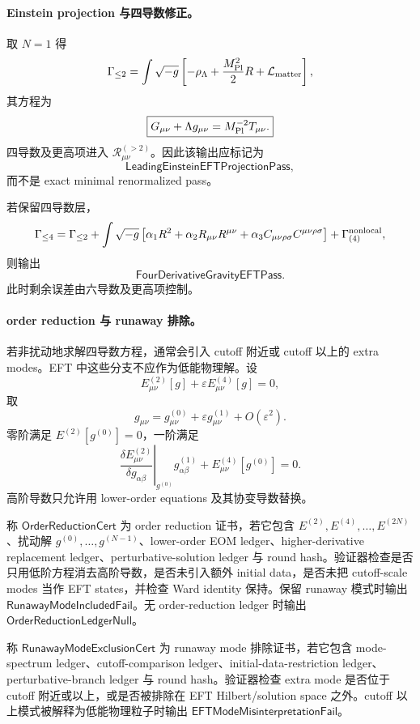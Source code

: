 \paragraph{Einstein projection 与四导数修正。}
取 \(N=1\) 得
\[
\Gamma_{\le2}
=
\int\sqrt{-g}
\left[
-\rho_\Lambda+\frac{M_{\rm Pl}^2}{2}R+\mathcal L_{\rm matter}
\right],
\]
其方程为
\[
\boxed{
G_{\mu\nu}+\Lambda g_{\mu\nu}
=
M_{\rm Pl}^{-2}T_{\mu\nu}.
}
\]
四导数及更高项进入 \(\mathcal R_{\mu\nu}^{(>2)}\)。因此该输出应标记为
\[
\mathsf{LeadingEinsteinEFTProjectionPass},
\]
而不是 exact minimal renormalized pass。

若保留四导数层，
\[
\Gamma_{\le4}
=
\Gamma_{\le2}
+
\int\sqrt{-g}
\left[
\alpha_1R^2+\alpha_2R_{\mu\nu}R^{\mu\nu}
+\alpha_3C_{\mu\nu\rho\sigma}C^{\mu\nu\rho\sigma}
\right]
+
\Gamma_{(4)}^{\rm nonlocal},
\]
则输出
\[
\mathsf{FourDerivativeGravityEFTPass}.
\]
此时剩余误差由六导数及更高项控制。

\paragraph{order reduction 与 runaway 排除。}
若非扰动地求解四导数方程，通常会引入 cutoff 附近或 cutoff 以上的 extra modes。EFT 中这些分支不应作为低能物理解。设
\[
E_{\mu\nu}^{(2)}[g]+\varepsilon E_{\mu\nu}^{(4)}[g]=0,
\]
取
\[
g_{\mu\nu}=g_{\mu\nu}^{(0)}+\varepsilon g_{\mu\nu}^{(1)}+O(\varepsilon^2).
\]
零阶满足 \(E^{(2)}[g^{(0)}]=0\)，一阶满足
\[
\left.
\frac{\delta E_{\mu\nu}^{(2)}}{\delta g_{\alpha\beta}}
\right|_{g^{(0)}}
g_{\alpha\beta}^{(1)}
+
E_{\mu\nu}^{(4)}[g^{(0)}]=0.
\]
高阶导数只允许用 lower-order equations 及其协变导数替换。

\begin{definition}\label{def:typed-address-biaxial-completion-order-reduction-cert}
称 \(\mathsf{OrderReductionCert}\) 为 order reduction 证书，若它包含 \(E^{(2)},E^{(4)},\ldots,E^{(2N)}\)、扰动解 \(g^{(0)},\ldots,g^{(N-1)}\)、lower-order EOM ledger、higher-derivative replacement ledger、perturbative-solution ledger 与 round hash。验证器检查是否只用低阶方程消去高阶导数，是否未引入额外 initial data，是否未把 cutoff-scale modes 当作 EFT states，并检查 Ward identity 保持。保留 runaway 模式时输出 \(\mathsf{RunawayModeIncludedFail}\)。无 order-reduction ledger 时输出 \(\mathsf{OrderReductionLedgerNull}\)。
\end{definition}

\begin{definition}\label{def:typed-address-biaxial-completion-runaway-mode-exclusion-cert}
称 \(\mathsf{RunawayModeExclusionCert}\) 为 runaway mode 排除证书，若它包含 mode-spectrum ledger、cutoff-comparison ledger、initial-data-restriction ledger、perturbative-branch ledger 与 round hash。验证器检查 extra mode 是否位于 cutoff 附近或以上，或是否被排除在 EFT Hilbert/solution space 之外。cutoff 以上模式被解释为低能物理粒子时输出 \(\mathsf{EFTModeMisinterpretationFail}\)。
\end{definition}

